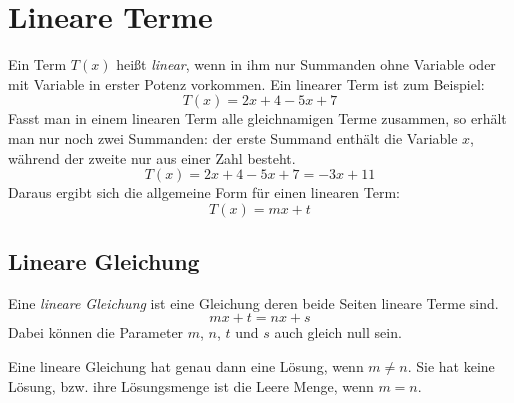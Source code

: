 \section{Lineare Terme}
\label{sec:linterm}

\begin{defi}
 Ein Term \(T(x)\) heißt \emph{linear}, wenn in ihm nur Summanden ohne Variable oder mit Variable in erster Potenz vorkommen. Ein linearer Term ist zum Beispiel:
 \begin{equation*}
  T(x) = 2x+4-5x+7
 \end{equation*}
 Fasst man in einem linearen Term alle gleichnamigen Terme zusammen, so erhält man nur noch zwei Summanden: der erste Summand enthält die Variable \(x\), während der zweite nur aus einer Zahl besteht.
 \begin{equation*}
  T(x) = 2x+4-5x+7 = -3x+11
 \end{equation*}
 Daraus ergibt sich die allgemeine Form für einen linearen Term:
 \begin{equation*}
  T(x) = mx+t
 \end{equation*}
\end{defi}

\subsection{Lineare Gleichung}

\begin{defi}
 Eine \emph{lineare Gleichung} ist eine Gleichung deren beide Seiten lineare Terme sind.
 \begin{equation*}
  mx+t = nx+s
 \end{equation*}
 Dabei können die Parameter \(m\), \(n\), \(t\) und \(s\) auch gleich null sein.
 
 Eine lineare Gleichung hat genau dann eine Lösung, wenn \(m\ne n\). Sie hat keine Lösung, bzw. ihre Lösungsmenge ist die Leere Menge, wenn \(m=n\).
\end{defi}

